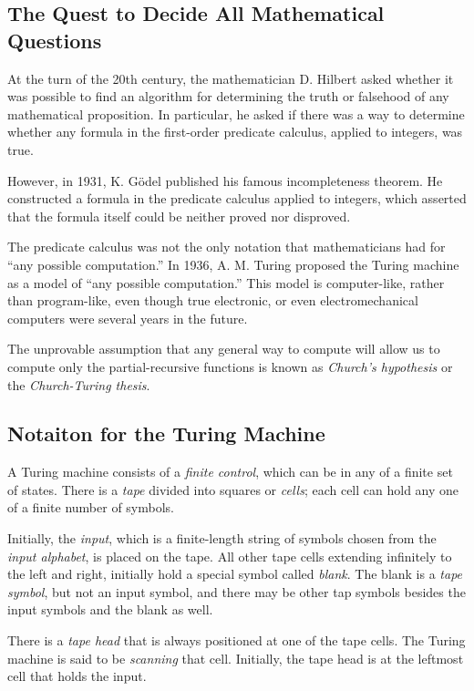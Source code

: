 \documentclass[]{article}
\begin{document}
\subsection*{The Quest to Decide All Mathematical Questions}
At the turn of the 20th century, the mathematician D. Hilbert asked whether 
it was possible to find an algorithm for determining the truth or falsehood 
of any mathematical proposition. In particular, he asked if there was a way 
to determine whether any formula in the first-order predicate calculus, 
applied to integers, was true.

However, in 1931, K. G\"odel published his famous incompleteness theorem. 
He constructed a formula in the predicate calculus applied to integers, 
which asserted that the formula itself could be neither proved nor 
disproved.

The predicate calculus was not the only notation that mathematicians had 
for ``any possible computation.'' In 1936, A. M. Turing proposed the Turing 
machine as a model of ``any possible computation.'' This model is 
computer-like, rather than program-like, even though true electronic, or 
even electromechanical computers were several years in the future.

The unprovable assumption that any general way to compute will allow us to
compute only the partial-recursive functions is known as 
\emph{Church's hypothesis} or the \emph{Church-Turing thesis}.

\subsection*{Notaiton for the Turing Machine}
A Turing machine consists of a \emph{finite control}, which can be in any 
of a finite set of states. There is a \emph{tape} divided into squares or
\emph{cells}; each cell can hold any one of a finite number of symbols.

Initially, the \emph{input}, which is a finite-length string of symbols 
chosen from the \emph{input alphabet}, is placed on the tape. All other 
tape cells extending infinitely to the left and right, initially hold a 
special symbol called \emph{blank}. The blank is a \emph{tape symbol}, but 
not an input symbol, and there may be other tap symbols besides the input 
symbols and the blank as well.

There is a \emph{tape head} that is always positioned at one of the tape 
cells. The Turing machine is said to be \emph{scanning} that cell. 
Initially, the tape head is at the leftmost cell that holds the input.
\end{document}
